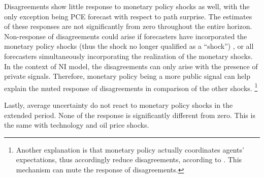 \documentclass[]{article}
\begin{document}
	Disagreements show little response to monetary policy shocks as well, with the only exception being PCE forecast with respect to path surprise. The estimates of these responses are not  significantly from zero throughout the entire horizon. Non-response of disagreements could arise if forecasters have incorporated the monetary policy shocks (thus the shock no longer qualified as a ``shock'') , or all forecasters simultaneously incorporating the realization of the monetary shocks. In the context of NI model, the disagreements can only arise with the presence of private signals. Therefore, monetary policy being a more public signal can help explain the muted response of disagreements in comparison of the other shocks. \footnote{Another explanation is that monetary policy actually coordinates agents' expectations, thus accordingly reduce disagreements, according to \citet{morris2002social}. This mechanism can mute the response of disagreements.}
	
	Lastly, average uncertainty do not react to monetary policy shocks in the extended period. None of the response is significantly different from zero. This is the same with technology and oil price shocks. 
	
\end{document}
